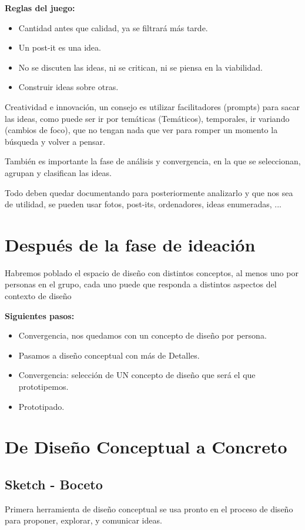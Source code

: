 \documentclass[12pt]{report} %
\begin{document}
\textbf{Reglas del juego:}
\begin{itemize}
  \item Cantidad antes que calidad, ya se filtrará más tarde.
  \item Un post-it es una idea.
  \item No se discuten las ideas, ni se critican, ni se piensa en la viabilidad.
  \item Construir ideas sobre otras.
\end{itemize}

Creatividad e innovación, un consejo es utilizar facilitadores (prompts) para sacar las ideas, como puede ser ir por temáticas (Temáticos), temporales, ir variando (cambios de foco), que no tengan nada que ver para romper un momento la búsqueda y volver a pensar.

También es importante la fase de análisis y convergencia, en la que se seleccionan, agrupan y clasifican las ideas.

Todo deben quedar documentando para posteriormente analizarlo y que nos sea de utilidad, se pueden usar fotos, post-its, ordenadores, ideas enumeradas, ...

\section{Después de la fase de ideación}

Habremos poblado el espacio de diseño con distintos conceptos, al menos uno por personas en el grupo, cada uno puede que responda a distintos aspectos del contexto de diseño

\textbf{Siguientes pasos:}
\begin{itemize}
  \item Convergencia, nos quedamos con un concepto de diseño por persona.
  \item Pasamos a diseño conceptual con más de Detalles.
  \item Convergencia: selección de UN concepto de diseño que será el que prototipemos.
  \item Prototipado.
\end{itemize}

\section{De Diseño Conceptual a Concreto}
\subsection{Sketch - Boceto}
Primera herramienta de diseño conceptual se usa pronto en el proceso de diseño para proponer, explorar, y comunicar ideas.
\end{document}
